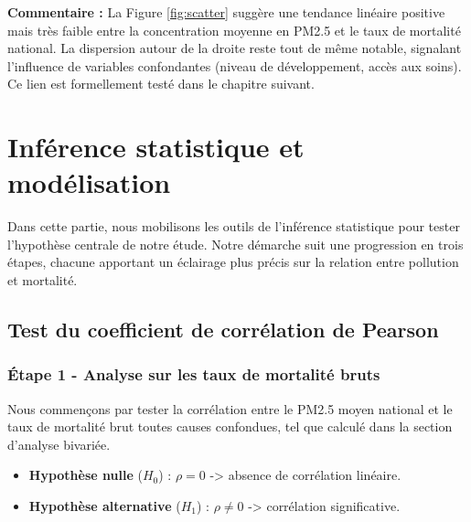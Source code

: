 \documentclass[mstat,12pt]{unswthesis}
\newenvironment{Shaded}{\begin{snugshade}}{\end{snugshade}}
\newcommand{\AttributeTok}[1]{\textcolor[rgb]{0.13,0.29,0.53}{#1}}
\newcommand{\FunctionTok}[1]{\textcolor[rgb]{0.13,0.29,0.53}{\textbf{#1}}}
\newcommand{\NormalTok}[1]{#1}
\newcommand{\OtherTok}[1]{\textcolor[rgb]{0.56,0.35,0.01}{#1}}
\newcommand{\SpecialCharTok}[1]{\textcolor[rgb]{0.81,0.36,0.00}{\textbf{#1}}}
\newcommand{\StringTok}[1]{\textcolor[rgb]{0.31,0.60,0.02}{#1}}
\begin{document}
\textbf{Commentaire :} La Figure \ref{fig:scatter} suggère une tendance
linéaire positive mais très faible entre la concentration moyenne en
PM2.5 et le taux de mortalité national. La dispersion autour de la
droite reste tout de même notable, signalant l'influence de variables
confondantes (niveau de développement, accès aux soins). Ce lien est
formellement testé dans le chapitre suivant.

\chapter{Inférence statistique et
modélisation}\label{infuxe9rence-statistique-et-moduxe9lisation}

Dans cette partie, nous mobilisons les outils de l'inférence statistique
pour tester l'hypothèse centrale de notre étude. Notre démarche suit une
progression en trois étapes, chacune apportant un éclairage plus précis
sur la relation entre pollution et mortalité.

\section{Test du coefficient de corrélation de
Pearson}\label{test-du-coefficient-de-corruxe9lation-de-pearson}

\subsection{Étape 1 - Analyse sur les taux de mortalité
bruts}\label{uxe9tape-1---analyse-sur-les-taux-de-mortalituxe9-bruts}

Nous commençons par tester la corrélation entre le PM2.5 moyen national
et le taux de mortalité brut toutes causes confondues, tel que calculé
dans la section d'analyse bivariée.

\begin{itemize}
\tightlist
\item
  \textbf{Hypothèse nulle} (\(H_0\)) : \(\rho = 0\) -\textgreater{}
  absence de corrélation linéaire.
\item
  \textbf{Hypothèse alternative} (\(H_1\)) : \(\rho \neq 0\)
  -\textgreater{} corrélation significative.
\end{itemize}

\begin{Shaded}
\end{Shaded}
\end{document}
